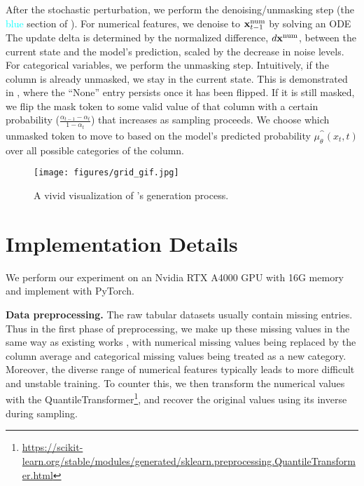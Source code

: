 \begin{rebuttal}
After the stochastic perturbation, we perform the denoising/unmasking step (the \textcolor{cyan}{blue} section of ). For numerical features, we denoise to ${\mathbf{x}}_{t-1}^{\text{num}}$ by solving an ODE The update delta is determined by the normalized difference, $d{\mathbf{x}}^{\text{num}}$, between the current state and the model’s prediction, scaled by the decrease in noise levels. For categorical variables, we perform the unmasking step. Intuitively, if the column is already unmasked, we stay in the current state. This is demonstrated in , where the ``None'' entry persists once it has been flipped. If it is still masked, we flip the mask token to some valid value of that column with a certain probability ($\frac{\alpha_{t-1}-\alpha_t}{1-\alpha_t}$) that increases as sampling proceeds. We choose which unmasked token to move to based on the model's predicted probability $\mu_{\theta}^{\cat}(x_t, t)$ over all possible categories of the column.

\end{rebuttal}

\begin{figure}[t]
    \vspace{-10pt}
    \centering
    \texttt{[image: figures/grid\_gif.jpg]}
    \caption{A vivid visualization of \method's generation process.}
    \label{fig:gif}
    \vspace{-10pt}
\end{figure}

\section{Implementation Details}
We perform our experiment on an Nvidia RTX A4000 GPU with 16G memory and implement \method with PyTorch.
\label{appendix:implementation_details}

\textbf{Data preprocessing.} The raw tabular datasets usually contain missing entries. Thus in the first phase of preprocessing, we make up these missing values in the same way as existing works \citep{tabddpm,zhang2024mixedtype}, with numerical missing values being replaced by the column average and categorical missing values being treated as a new category. Moreover, the diverse range of numerical features typically leads to more difficult and unstable training. To counter this, we then transform the numerical values with the QuantileTransformer\footnote{\url{https://scikit-learn.org/stable/modules/generated/sklearn.preprocessing.QuantileTransformer.html}},  and recover the original values using its inverse during sampling.

